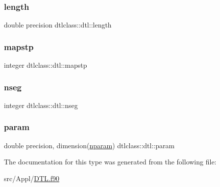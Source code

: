 \subsubsection{\texorpdfstring{length}{length}}
{\footnotesize\ttfamily double precision dtlclass\+::dtl\+::length}

\mbox{\label{structdtlclass_1_1dtl_ad89c7805074fee80c05af3ae3861cb87}} 
\subsubsection{\texorpdfstring{mapstp}{mapstp}}
{\footnotesize\ttfamily integer dtlclass\+::dtl\+::mapstp}

\mbox{\label{structdtlclass_1_1dtl_ab0c5195ab0993ee3107484257b94cfe5}} 
\subsubsection{\texorpdfstring{nseg}{nseg}}
{\footnotesize\ttfamily integer dtlclass\+::dtl\+::nseg}

\mbox{\label{structdtlclass_1_1dtl_a95bc1c81e12444e39d8ea61b6e67ae34}} 
\subsubsection{\texorpdfstring{param}{param}}
{\footnotesize\ttfamily double precision, dimension(\mbox{\hyperlink{namespacedtlclass_adf04761c96168c3dc492c89c72194cea}{nparam}}) dtlclass\+::dtl\+::param}



The documentation for this type was generated from the following file\+:\begin{DoxyCompactItemize}
\item 
src/\+Appl/\mbox{\hyperlink{_d_t_l_8f90}{D\+T\+L.\+f90}}\end{DoxyCompactItemize}
